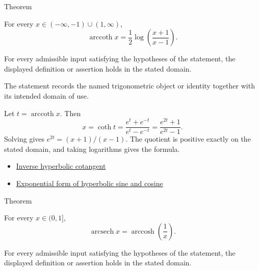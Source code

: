 \begin{theorembox}{Theorem}
\begin{theorem}
\label{thm:inverse-hyperbolic-cotangent-log-form}
For every $x\in(-\infty,-1)\cup(1,\infty)$,
\[
  \operatorname{arccoth} x=\frac{1}{2}\log\!\left(\frac{x+1}{x-1}\right).
\]
\end{theorem}
\end{theorembox}
\begin{remark*}
For every admissible input satisfying the hypotheses of the statement, the
displayed definition or assertion holds in the stated domain.
\end{remark*}

\begin{remark*}[Interpretation]
The statement records the named trigonometric object or identity together with
its intended domain of use.
\end{remark*}

\begin{remark*}[Proof]
Let $t=\operatorname{arccoth}x$. Then
\[
  x=\operatorname{coth}t=\frac{e^t+e^{-t}}{e^t-e^{-t}}
  =\frac{e^{2t}+1}{e^{2t}-1}.
\]
Solving gives $e^{2t}=(x+1)/(x-1)$. The quotient is positive exactly on the
stated domain, and taking logarithms gives the formula.
\end{remark*}
\begin{dependencies}
\begin{itemize}
  \item \hyperref[def:inverse-hyperbolic-cotangent]{Inverse hyperbolic cotangent}
  \item \hyperref[thm:hyperbolic-exponential-form]{Exponential form of hyperbolic sine and cosine}
\end{itemize}
\end{dependencies}

\begin{theorembox}{Theorem}
\begin{theorem}
\label{thm:inverse-hyperbolic-secant-reciprocal-form}
For every $x\in(0,1]$,
\[
  \operatorname{arcsech} x=\operatorname{arccosh}\!\left(\frac{1}{x}\right).
\]
\end{theorem}
\end{theorembox}
\begin{remark*}
For every admissible input satisfying the hypotheses of the statement, the
displayed definition or assertion holds in the stated domain.
\end{remark*}

